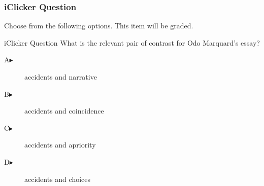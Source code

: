 \begin{frame}
  \frametitle{iClicker Question}
Choose from the following options. This item will be graded.
\begin{block}{iClicker Question}
What is the relevant pair of contrast for Odo Marquard's essay?
\end{block}
\begin{description}
\item[A\hspace{.2in}$\blacktriangleright$] accidents and narrative
\item[B\hspace{.2in}$\blacktriangleright$] accidents and coincidence
\item[C\hspace{.2in}$\blacktriangleright$] accidents and apriority
\item[D\hspace{.2in}$\blacktriangleright$] accidents and choices
\end{description}
\end{frame}
